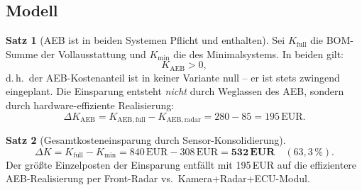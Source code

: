 ﻿\documentclass[a4paper,12pt]{article}
\theoremstyle{definition}
\newtheorem{satz}{Satz}
\begin{document}
\subsection{Modell}

\begin{satz}[AEB ist in beiden Systemen Pflicht und enthalten]
\label{satz:aeb_in_beiden}
Sei $K_\mathrm{full}$ die BOM-Summe der Vollausstattung und
$K_\mathrm{min}$ die des Minimalsystems. In beiden gilt:
\[
K_\mathrm{AEB} > 0,
\]
d.\,h.\ der AEB-Kostenanteil ist in keiner Variante null -- er ist
stets zwingend eingeplant. Die Einsparung entsteht \emph{nicht} durch
Weglassen des AEB, sondern durch hardware-effiziente Realisierung:
\[
\Delta K_\mathrm{AEB} = K_\mathrm{AEB,full} - K_\mathrm{AEB,radar}
= 280 - 85 = 195\,\text{EUR}.
\]
\end{satz}

\begin{satz}[Gesamtkosteneinsparung durch Sensor-Konsolidierung]
\label{satz:kosten}
\[
\Delta K = K_\mathrm{full} - K_\mathrm{min}
= 840\,\text{EUR} - 308\,\text{EUR} = \mathbf{532\,\text{EUR}}
\quad (63{,}3\,\%).
\]
Der gr\"o\ss{}te Einzelposten der Einsparung entf\"allt mit 195\,EUR auf
die effizientere AEB-Realisierung per Front-Radar vs.\ Kamera+Radar+ECU-Modul.
\end{satz}
\end{document}
